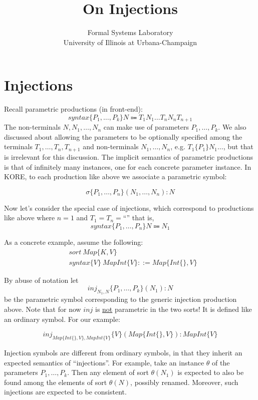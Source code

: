 \documentclass[UTF8,11pt]{article}
\title{On Injections}
\author{Formal Systems Laboratory \\
          University of Illinois at Urbana-Champaign}
\theoremstyle{plain}
\theoremstyle{definition}
\theoremstyle{remark}
\begin{document}
\maketitle



\section{Injections}
\label{sec:injections}


Recall parametric productions (in front-end):
\[ syntax \{P_1, \dots , P_k\} N \Coloneqq T_1 N_1 \dots T_n N_n T_{n+1} \]
The non-terminals $N, N_1, \dots, N_n$ can make use of parameters $P_1, \dots, P_k$. We also discussed about allowing the parameters to be optionally specified among the terminals $T_1, \dots, T_n, T_{n+1}$ and non-terminals $N_1, \dots, N_n$, e.g. $T_1 \{P_1\} N_1 \dots$, but that is irrelevant for this discussion. The implicit semantics of parametric productions is that of infinitely many instances, one for each concrete parameter instance. In KORE, to each production like above we associate a parametric symbol:

\[ \sigma \{P_1, \dots , P_n\}(N_1, \dots, N_n):N \]

Now let's consider the special case of injections, which correspond to productions like above where $n=1$ and $T_1 = T_n = $``'' that is,
\[ syntax \{P_1, \dots, P_n\} N \Coloneqq N_1\]

As a concrete example, assume the following:
\begin{align*}
&sort \ Map\{K,V\} \\
&syntax \{V\} \ MapInt\{V\} ::= Map\{Int\{\}, V\}
\end{align*}

By abuse of notation let \[inj_{N_1,N}\{P_1, \dots,P_k\}(N_1):N\] be the parametric symbol corresponding to the generic injection production above. Note that for now $inj$ is \underline{not} parametric in the two sorts! It is defined like an ordinary symbol. For our example:

\[inj_{Map\{Int\{\},V\},MapInt\{V\}}\{V\}(Map\{Int\{\},V\}):MapInt\{V\}\]


Injection symbols are different from ordinary symbols, in that they inherit an expected semantics of ``injections''. For example, take an instance $\theta$ of the parameters $P_1, \dots,P_k$. Then any element of sort $\theta(N_1)$ is expected to also be found among the elements of sort $\theta(N)$, possibly renamed. Moreover, such injections are expected to be consistent.
\end{document}
